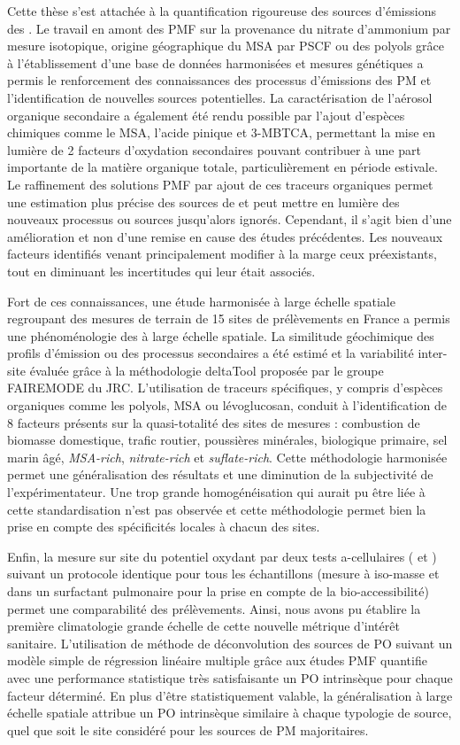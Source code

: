 Cette thèse s'est attachée à la quantification rigoureuse des sources d'émissions des \PMdix.
Le travail en amont des PMF sur la provenance du nitrate d'ammonium par mesure
isotopique, origine géographique du MSA par PSCF ou des polyols grâce à l'établissement
d'une base de données harmonisées et mesures génétiques a permis le renforcement des
connaissances des processus d'émissions des PM et l'identification de nouvelles sources
potentielles.
La caractérisation de l'aérosol organique secondaire a également été rendu possible par
l'ajout d'espèces chimiques comme le MSA, l'acide pinique et 3-MBTCA, permettant la mise
en lumière de 2 facteurs d'oxydation secondaires pouvant contribuer à une part importante
de la matière organique totale, particulièrement en période estivale.
Le raffinement des solutions PMF par ajout de ces traceurs organiques permet une
estimation plus précise des sources de \PMdix{} et peut mettre en lumière des nouveaux
processus ou sources jusqu'alors ignorés.
Cependant, il s'agit bien d'une amélioration et non d'une remise en cause des études
précédentes. Les nouveaux facteurs identifiés venant principalement modifier à la marge ceux
préexistants, tout en diminuant les incertitudes qui leur était associés.

Fort de ces connaissances, une étude harmonisée à large échelle spatiale regroupant des
mesures de terrain de 15 sites de prélèvements en France a permis une phénoménologie des
\PMdix{} à large échelle spatiale. La similitude géochimique des profils d'émission ou
des processus secondaires a été estimé et la variabilité inter-site évaluée grâce
à la méthodologie deltaTool proposée par le groupe FAIREMODE du JRC. L'utilisation de traceurs
spécifiques, y compris d'espèces organiques comme les polyols, MSA ou lévoglucosan,
conduit à l'identification de 8 facteurs présents sur la quasi-totalité des sites de
mesures : combustion de biomasse domestique, trafic routier, poussières minérales,
biologique primaire, sel marin âgé, \textit{MSA-rich}, \textit{nitrate-rich} et \textit{suflate-rich}.
Cette méthodologie harmonisée permet une généralisation des résultats et une diminution de
la subjectivité de l'expérimentateur. Une trop grande homogénéisation qui aurait pu être
liée à cette standardisation n'est pas observée et cette méthodologie permet bien la prise
en compte des spécificités locales à chacun des sites.

Enfin, la mesure sur site du potentiel oxydant par deux tests a-cellulaires (\POAA{} et
\PODTT) suivant un protocole identique pour tous les échantillons (mesure à iso-masse et
dans un surfactant pulmonaire pour la prise en compte de la bio-accessibilité) permet une
comparabilité des prélèvements. Ainsi, nous avons pu établire la première climatologie grande échelle
de cette nouvelle métrique d'intérêt sanitaire.
L'utilisation de méthode de déconvolution des sources de PO suivant un modèle simple de
régression linéaire multiple grâce aux études PMF quantifie avec une performance
statistique très satisfaisante un PO intrinsèque pour chaque facteur déterminé.
En plus d'être statistiquement valable, la généralisation à large échelle spatiale
attribue un PO intrinsèque similaire à chaque typologie de source, quel que soit le site
considéré pour les sources de PM majoritaires.

